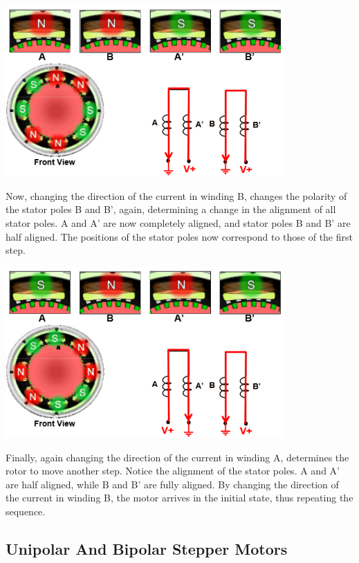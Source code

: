 \begin{center}
	\includegraphics[width=0.8\textwidth]{figures/move/motor34}
	\label{fig:hybrid_third_step}
\end{center}
\newpage
Now, changing the direction of the current in winding B, changes the polarity of the stator poles B and B', again, determining a change in the alignment of all stator poles. A and A’ are now completely aligned, and stator poles B and B’ are half aligned. The positions of the stator poles now correspond to those of the first step.

\begin{center}
	\includegraphics[width=0.8\textwidth]{figures/move/motor35}
	\label{fig:hybrid_forth_step}
\end{center}


Finally, again changing the direction of the current in winding A, determines the rotor to move another step. Notice the alignment of the stator poles. A and A’ are half aligned, while B and B’ are fully aligned. By changing the direction of the current in winding B, the motor arrives in the initial state, thus repeating the sequence.
\newpage

\subsection{Unipolar And Bipolar Stepper Motors}

